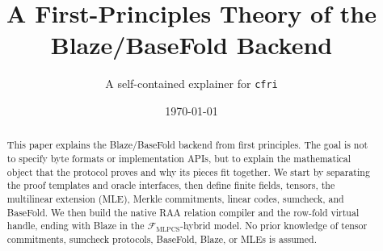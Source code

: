 \documentclass[11pt]{article}
\title{A First-Principles Theory of the Blaze/BaseFold Backend}
\author{A self-contained explainer for \texttt{cfri}}
\date{\today}
\begin{document}
\maketitle

\begin{abstract}
This paper explains the Blaze/BaseFold backend from first principles.  The goal
is not to specify byte formats or implementation APIs, but to explain the
mathematical object that the protocol proves and why its pieces fit together.
We start by separating the proof templates and oracle interfaces, then define
finite fields, tensors, the multilinear extension (MLE), Merkle commitments,
linear codes, sumcheck, and BaseFold.  We then build the native RAA relation
compiler and the row-fold virtual handle, ending with Blaze in the
\(\mathcal F_{\mathrm{MLPCS}}\)-hybrid model.
No prior
knowledge of tensor commitments, sumcheck protocols, BaseFold, Blaze, or MLEs is
assumed.
\end{abstract}

\tableofcontents












\end{document}
